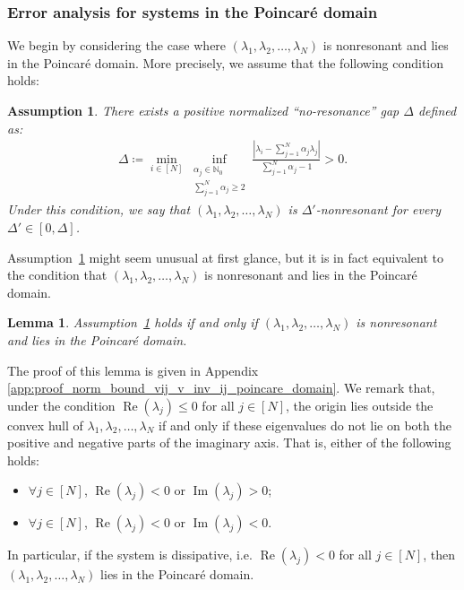 \documentclass[superscriptaddress,onecolumn,nofootinbib,longbibliography,a4paper,accepted=2026-09-29]{quantumarticle}
\theoremstyle{plain}
\newtheorem{assumption}[thm]{Assumption}
\newtheorem{lemma}[thm]{Lemma}
\theoremstyle{definition}
\numberwithin{thm}{section}
\numberwithin{assumption}{section}
\numberwithin{lemma}{section}
\numberwithin{prop}{section}
\numberwithin{cor}{section}
\numberwithin{definition}{section}
\numberwithin{rmk}{section}
\numberwithin{equation}{section}
\newcommand{\abs}[1]      {\left| #1 \right|}
\newcommand{\myN}{\mathbb{N}}
\newcommand{\lrb}[1]{\left ( #1 \right )}
\newcommand{\defeq}{\coloneqq}
\newcommand{\realpart}[1]{\operatorname{Re}\lrb{#1}}
\newcommand{\imaginarypart}[1]{\operatorname{Im}\lrb{#1}}
\begin{document}
\subsubsection{Error analysis for systems in the Poincar\'{e} domain}
\label{subsubsec:error_analysis_poincare_domain}

We begin by considering the case where $(\lambda_1, \lambda_2, \dots, \lambda_N)$ is nonresonant and lies in the Poincar\'{e} domain. More precisely, we assume that the following condition holds:
\begin{assumption}
There exists a positive normalized ``no-resonance'' gap $\Delta$ defined as:
\begin{align}
\Delta \defeq \min_{i \in [N]} \inf_{\substack{\alpha_j \in \myN_0 \\ \sum_{j=1}^N \alpha_j \ge 2}} \frac{\abs{\lambda_i-\sum_{j=1}^N \alpha_j\lambda_j}}{\sum_{j=1}^N \alpha_j-1} > 0.   
\label{eq:linear_no_resonance_gap}
\end{align}
Under this condition, we say that $(\lambda_1, \lambda_2, \dots, \lambda_N)$ is $\Delta'$-nonresonant for every $\Delta' \in [0, \Delta]$.
\label{assump:linear_no_resonance_gap}
\end{assumption}


Assumption~\ref{assump:linear_no_resonance_gap} might seem unusual at first glance, but it is in fact equivalent to the condition that $(\lambda_1, \lambda_2, \dots, \lambda_N)$ is nonresonant and lies in the Poincar\'{e} domain.

\begin{lemma}
Assumption~\ref{assump:linear_no_resonance_gap} holds if and only if $(\lambda_1, \lambda_2, \dots, \lambda_N)$ is nonresonant and lies in the Poincar\'{e} domain.
\label{lem:equivalence_linear_no_resonance_gap_poincare_domain}
\end{lemma}

The proof of this lemma is given in Appendix \ref{app:proof_norm_bound_vij_v_inv_ij_poincare_domain}. We remark that, under the condition $\realpart{\lambda_j} \le 0$ for all $j \in [N]$, the origin lies outside the convex hull of $\lambda_1, \lambda_2, \dots, \lambda_N$ if and only if these eigenvalues do not lie on both the positive and negative parts of the imaginary axis. That is, either of the following holds:
\begin{itemize}
    \item $\forall j \in [N]$, $\realpart{\lambda_j}<0$ or $\imaginarypart{\lambda_j} > 0$;
    \item $\forall j \in [N]$, $\realpart{\lambda_j}<0$ or $\imaginarypart{\lambda_j} < 0$.
\end{itemize}
In particular, if the system is dissipative, i.e. $\realpart{\lambda_j} < 0$ for all $j \in [N]$, then $(\lambda_1, \lambda_2, \dots, \lambda_N)$ lies in the Poincar\'{e} domain.
\end{document}
